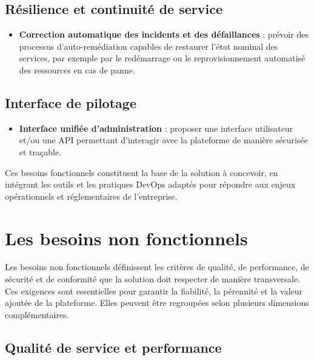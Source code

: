 \subsection{Résilience et continuité de service}

\begin{itemize}
	\item \textbf{Correction automatique des incidents et des défaillances} : prévoir des processus d'auto-remédiation capables de restaurer l'état nominal des services, par exemple par le redémarrage ou le reprovisionnement automatisé des ressources en cas de panne.
\end{itemize}

\subsection{Interface de pilotage}

\begin{itemize}
	\item \textbf{Interface unifiée d'administration} : proposer une interface utilisateur et/ou une API permettant d'interagir avec la plateforme de manière sécurisée et traçable.
\end{itemize}

Ces besoins fonctionnels constituent la base de la solution à concevoir, en intégrant les outils et les pratiques DevOps adaptés pour répondre aux enjeux opérationnels et réglementaires de l'entreprise.

\section{Les besoins non fonctionnels}

Les besoins non fonctionnels définissent les critères de qualité, de performance, de sécurité et de conformité que la solution doit respecter de manière transversale. Ces exigences sont essentielles pour garantir la fiabilité, la pérennité et la valeur ajoutée de la plateforme. Elles peuvent être regroupées selon plusieurs dimensions complémentaires.

\subsection{Qualité de service et performance}

